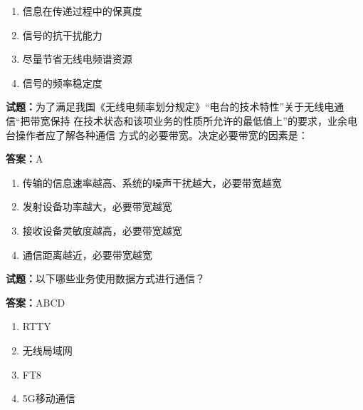\documentclass{ctexbook}
\begin{document}
\begin{enumerate}[leftmargin=3em]
  \item 信息在传递过程中的保真度 

  \item 信号的抗干扰能力 

  \item 尽量节省无线电频谱资源 

  \item 信号的频率稳定度 

\end{enumerate}





\vspace{1em}

\textbf{试题：}为了满足我国《无线电频率划分规定》“电台的技术特性”关于无线电通信“把带宽保持
在技术状态和该项业务的性质所允许的最低值上”的要求，业余电台操作者应了解各种通信
方式的必要带宽。决定必要带宽的因素是： 

\textbf{答案：}A 

\begin{enumerate}[leftmargin=3em]
  \item 传输的信息速率越高、系统的噪声干扰越大，必要带宽越宽 

  \item 发射设备功率越大，必要带宽越宽 

  \item 接收设备灵敏度越高，必要带宽越宽 

  \item 通信距离越近，必要带宽越宽 

\end{enumerate}





\vspace{1em}

\textbf{试题：}以下哪些业务使用数据方式进行通信？ 

\textbf{答案：}ABCD 

\begin{enumerate}[leftmargin=3em]
  \item RTTY 

  \item 无线局域网 

  \item FT8 

  \item 5G移动通信 

\end{enumerate}
\end{document}
